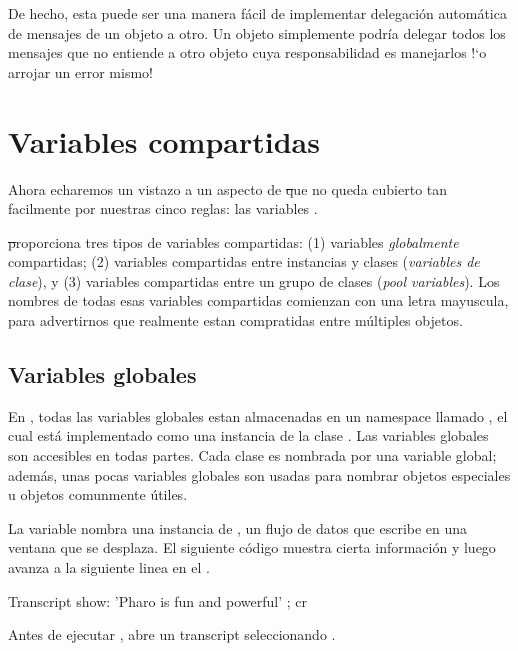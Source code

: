 \documentclass[a4paper,10pt,twoside]{book}
\begin{document}
De hecho, esta puede ser una manera f\'acil de implementar delegaci\'on autom\'atica de mensajes de un objeto a otro.
Un objeto  simplemente podr\'ia delegar todos los mensajes que no entiende a otro objeto cuya responsabilidad es manejarlos !`o arrojar un error mismo!

\section{Variables compartidas}

Ahora echaremos un vistazo a un aspecto de \st que no queda cubierto tan facilmente por nuestras cinco reglas: las variables .

\st proporciona tres tipos de variables compartidas: (1) variables \emph{globalmente} compartidas; (2) variables compartidas entre instancias y clases (\emph{variables de clase}), y (3) variables compartidas entre un grupo de clases (\emph{pool variables}).  Los nombres de todas esas variables compartidas comienzan con una letra mayuscula, para advertirnos que realmente estan compratidas entre m\'ultiples objetos.

\subsection{Variables globales}
En \pharo, todas las variables globales estan almacenadas en un namespace llamado , el cual est\'a implementado como una instancia de la clase .
Las variables globales son accesibles en todas partes. 
Cada clase es nombrada por una variable global; adem\'as, unas pocas variables globales son usadas para nombrar objetos especiales u objetos comunmente \'utiles.

La variable  nombra una instancia de , un flujo de datos que escribe en una ventana que se desplaza.
El siguiente c\'odigo muestra cierta informaci\'on y luego avanza a la siguiente linea en el .

\begin{code}{}
Transcript show: 'Pharo is fun and powerful' ; cr
\end{code}

\noindent
Antes de ejecutar , abre un transcript seleccionando .
\end{document}
